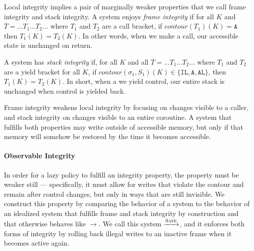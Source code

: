 \documentclass{article}
\begin{document}
      Local integrity implies a pair of marginally weaker properties that we call frame integrity and stack integrity.
      A system enjoys {\it frame integrity} if for all \(K\) and \(\overline{T} = \dots T_1 \dots T_2 \dots\) where
      \(T_1\) and \(T_2\) are a call bracket, if \(\mathit{contour}(T_1)(K) = \mathtt{A}\) then
      \(T_1(K) = T_2(K)\). In other words, when we make a call, our accessible state is unchanged on return.
      
      A system has \emph{stack integrity} if, for all \(K\) and all \(\overline{T} = \dots T_1 \dots T_2 \dots\) where
      \(T_1\) and \(T_2\) are a yield bracket for all \(K\), if \(\mathit{contour}(\sigma_1,S_1)(K) \in
      \{\mathtt{IL},\mathtt{A},\mathtt{AL}\}\), then \(T_1(K) = T_2(K)\). In short, when a we yield control,
      our entire stack is unchanged when control is yielded back.

      Frame integrity weakens local integrity by focusing on changes visible to a caller, and stack
      integrity on changes visible to an entire coroutine. A system that fulfills both properties may write outside
      of accessible memory, but only if that memory will somehow be restored by the time it becomes accessible.

    \paragraph{Observable Integrity}

      In order for a lazy policy to fulfill an integrity property, the property must be weaker still --- specifically,
      it must allow for writes that violate the contour and remain after control changes, but only in ways that are
      still invisible. We construct this property by comparing the behavior of a system to the behavior of an
      idealized system that fulfills frame  and stack integrity by construction and that otherwise behaves like
      \(\longrightarrow\). We call this system \(\xrightarrow{\text{\sc Safe}}\), and it enforces both forms of
      integrity by rolling back illegal writes to an inactive frame when it becomes active again.
\end{document}
